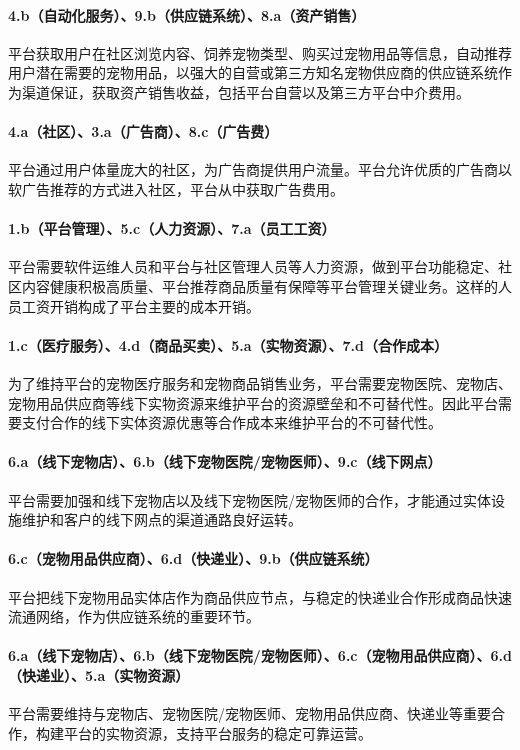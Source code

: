 \documentclass[a4paper]{ctexart}
\begin{document}
\paragraph{4.b（自动化服务）、9.b（供应链系统）、8.a（资产销售）}平台获取用户在社区浏览内容、饲养宠物类型、购买过宠物用品等信息，自动推荐用户潜在需要的宠物用品，以强大的自营或第三方知名宠物供应商的供应链系统作为渠道保证，获取资产销售收益，包括平台自营以及第三方平台中介费用。
\paragraph{4.a（社区）、3.a（广告商）、8.c（广告费）}平台通过用户体量庞大的社区，为广告商提供用户流量。平台允许优质的广告商以软广告推荐的方式进入社区，平台从中获取广告费用。
\paragraph{1.b（平台管理）、5.c（人力资源）、7.a（员工工资）}平台需要软件运维人员和平台与社区管理人员等人力资源，做到平台功能稳定、社区内容健康积极高质量、平台推荐商品质量有保障等平台管理关键业务。这样的人员工资开销构成了平台主要的成本开销。
\paragraph{1.c（医疗服务）、4.d（商品买卖）、5.a（实物资源）、7.d（合作成本）}为了维持平台的宠物医疗服务和宠物商品销售业务，平台需要宠物医院、宠物店、宠物用品供应商等线下实物资源来维护平台的资源壁垒和不可替代性。因此平台需要支付合作的线下实体资源优惠等合作成本来维护平台的不可替代性。
\paragraph{6.a（线下宠物店）、6.b（线下宠物医院/宠物医师）、9.c（线下网点）}平台需要加强和线下宠物店以及线下宠物医院/宠物医师的合作，才能通过实体设施维护和客户的线下网点的渠道通路良好运转。
\paragraph{6.c（宠物用品供应商）、6.d（快递业）、9.b（供应链系统）}平台把线下宠物用品实体店作为商品供应节点，与稳定的快递业合作形成商品快速流通网络，作为供应链系统的重要环节。
\paragraph{6.a（线下宠物店）、6.b（线下宠物医院/宠物医师）、6.c（宠物用品供应商）、6.d（快递业）、5.a（实物资源）}平台需要维持与宠物店、宠物医院/宠物医师、宠物用品供应商、快递业等重要合作，构建平台的实物资源，支持平台服务的稳定可靠运营。
\end{document}
